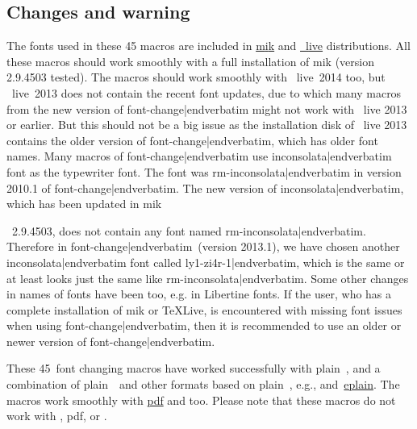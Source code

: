 {{\subsection{Changes and warning}The fonts used in these 45 macros are included in \href{http://miktex.org/}{{\caps m{\eightrm i}k}\capstex} and \href{http://www.tug.org/texlive/}{\capstex~{\caps l{\eightrm ive}}} distributions. All these mac\-ros should work smoothly with a full installation of {{\caps m{\eightrm i}k}\capstex} (version 2.9.4503 tested). The macros should work smoothly with \capstex~{\caps l{\eightrm ive}}~2014 too, but \capstex~{\caps l{\eightrm ive}}~2013 does not contain the recent font updates, due to which many macros from the new version of {\color{brown}\verbatim font-change|endverbatim} might not work with \capstex~{\caps l{\eightrm ive}} 2013 or earlier. But this should not be a big issue as the installation disk of \capstex~{\caps l{\eightrm ive}} 2013 contains the older version of {\color{brown}\verbatim font-change|endverbatim}, which has older font names. Many macros of {\color{brown}\verbatim font-change|endverbatim} use {\verbatim inconsolata|endverbatim} font as the typewriter font. The font was {\verbatim rm-inconsolata|endverbatim} in version 2010.1 of {\color{brown}\verbatim font-change|endverbatim}. The new version of {\verbatim inconsolata|endverbatim}, which has been updated in {\caps m{\eightrm i}k}\capstex}~2.9.4503, does not contain any font named {\verbatim rm-inconsolata|endverbatim}. Therefore in {\color{brown}\verbatim font-change|endverbatim}~(version 2013.1), we have chosen another {\verbatim inconsolata|endverbatim} font called {\verbatim ly1-zi4r-1|endverbatim}, which is the same or at least looks just the same like {\verbatim rm-inconsolata|endverbatim}. Some other changes in names of fonts have been too, e.g. in Libertine fonts. If the user, who has a complete installation of {{\caps m{\eightrm i}k}\capstex} or TeXLive, is encountered with missing font issues when using {\color{brown}\verbatim font-change|endverbatim}, then it is recommended to use an older or newer version of {\color{brown}\verbatim font-change|endverbatim}.

\footline{\centerline{\foliofont\folio}}


These 45~font changing macros have worked successfully with plain~\capstex, and a combination of plain~\capstex\ and other formats based on plain~\capstex, e.g.,  \href{http://www.tex.ac.uk/tex-archive/help/Catalogue/entries/amstex.html}{\amstex} and~\href{http://www.tex.ac.uk/tex-archive/help/Catalogue/entries/eplain.html}{eplain}. The macros work smoothly with \href{http://www.tex.ac.uk/tex-archive/help/Catalogue/entries/pdftex.html}{pdf\capstex} and \href{http://scripts.sil.org/cms/scripts/page.php?site_id=nrsi&id=xetex}{\capsxetex} too. Please note that these macros do not work with \href{http://www.tex.ac.uk/tex-archive/help/Catalogue/entries/latex.html}{\capslatex}, pdf\capslatex{}, or \capsxelatex.

}
